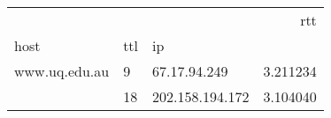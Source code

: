 \begin{center}
\begin{tabular}{lllr}
\toprule
              &    &                &       rtt \\
host & ttl & ip &           \\
\midrule
www.uq.edu.au & 9  & 67.17.94.249 &  3.211234 \\
              & 18 & 202.158.194.172 &  3.104040 \\
\bottomrule
\end{tabular}
\end{center}
